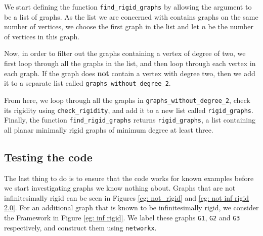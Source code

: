 \begin{flushleft}
We start defining the function \texttt{find\_rigid\_graphs} by allowing the argument to be a list of graphs. As the list we are concerned with contains graphs on the same number of vertices, we choose the first graph in the list and let $n$ be the number of vertices in this graph. 
\end{flushleft}

\begin{flushleft}
Now, in order to filter out the graphs containing a vertex of degree of two, we first loop through all the graphs in the list, and then loop through each vertex in each graph. If the graph does \textbf{not} contain a vertex with degree two, then we add it to a separate list called \texttt{graphs\_without\_degree\_2}. 
\end{flushleft}

\begin{flushleft}
From here, we loop through all the graphs in \texttt{graphs\_without\_degree\_2}, check its rigidity using \texttt{check\_rigidity}, and add it to a new list called \texttt{rigid\_graphs}. Finally, the function \texttt{find\_rigid\_graphs} returns \texttt{rigid\_graphs}, a list containing all planar minimally rigid graphs of minimum degree at least three.
\end{flushleft}

\subsection{Testing the code}

\begin{flushleft}
The last thing to do is to ensure that the code works for known examples before we start investigating graphs we know nothing about. Graphs that are not infinitesimally rigid can be seen in Figures \ref{eg: not_rigid} and \ref{eg: not inf rigid 2.0}. For an additional graph that is known to be infinitesimally rigid, we consider the Framework in Figure \ref{eg: inf rigid}. We label these graphs \texttt{G1}, \texttt{G2} and \texttt{G3} respectively, and construct them using \texttt{networkx}.
\end{flushleft}

